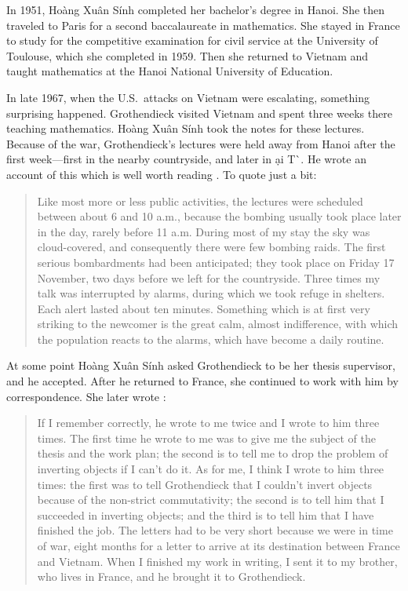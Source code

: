 \documentclass[reqno]{amsart}
\theoremstyle{definition}
\begin{document}
In 1951, Ho\`ang Xu\^an S\'inh completed her bachelor's degree in Hanoi.  She then traveled to Paris for a second baccalaureate in mathematics.  She stayed in France to study for the competitive examination for civil service at the University of Toulouse, which she completed in 1959.  Then she returned to Vietnam and taught mathematics at the Hanoi National University of Education.

In late 1967, when the U.S.\ attacks on Vietnam were escalating, something surprising happened.  Grothendieck visited Vietnam and spent three weeks there teaching mathematics. Ho\`ang Xu\^an S\'inh took the notes for these lectures.  Because of the war, Grothendieck's lectures were held away from Hanoi after the first week---first in the nearby countryside, and later in \DJ\d ai {T\`\uhorn \selectfont }.   He wrote an account of this which is well worth reading \cite{G67}.  To quote just a bit:
\begin{quote}
Like most more or less public activities, the lectures were scheduled between about
6 and 10 a.m., because the bombing usually took place later in the day, rarely before 11
a.m. During most of my stay the sky was cloud-covered, and consequently there were few
bombing raids. The first serious bombardments had been anticipated; they took place on
Friday 17 November, two days before we left for the countryside. Three times my talk was
interrupted by alarms, during which we took refuge in shelters. Each alert lasted about
ten minutes. Something which is at first very striking to the newcomer is the great calm,
almost indifference, with which the population reacts to the alarms, which have become a
daily routine. 
\end{quote}

At some point Ho\`ang Xu\^an S\'inh asked Grothendieck to be her thesis supervisor, and he accepted.  After he returned to France, she continued to work with him by correspondence.   She later wrote \cite{H23}:

\begin{quote}
If I remember correctly, he wrote to me twice and I wrote to him three times. The first time he wrote to me was to give me the subject of the thesis and the work plan; the second is to tell me to drop the problem of inverting objects if I can't do it. As for me, I think I wrote to him three times: the first was to tell Grothendieck that I couldn't invert objects because of the non-strict commutativity; the second is to tell him that I succeeded in inverting objects; and the third is to tell him that I have finished the job. The letters had to be very short because we were in time of war, eight months for a letter to arrive at its destination between France and Vietnam. When I finished my work in writing, I sent it to my brother, who lives in France, and he brought it to Grothendieck.
\end{quote}
\end{document}
